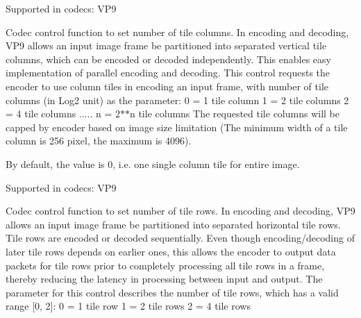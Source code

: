 \begin{Desc}
\begin{description}
Supported in codecs\+: V\+P9 \item[{\em 
V\+P9\+E\+\_\+\+S\+E\+T\+\_\+\+T\+I\+L\+E\+\_\+\+C\+O\+L\+U\+M\+NS\hypertarget{group__vp8__encoder_gga6deae3d561c838952552c3d3756322eca9c221dc99c51eb5e6304461aed9b5f5b}{}\label{group__vp8__encoder_gga6deae3d561c838952552c3d3756322eca9c221dc99c51eb5e6304461aed9b5f5b}
}]Codec control function to set number of tile columns. In encoding and decoding, V\+P9 allows an input image frame be partitioned into separated vertical tile columns, which can be encoded or decoded independently. This enables easy implementation of parallel encoding and decoding. This control requests the encoder to use column tiles in encoding an input frame, with number of tile columns (in Log2 unit) as the parameter\+: 0 = 1 tile column 1 = 2 tile columns 2 = 4 tile columns ..... n = 2$\ast$$\ast$n tile columns The requested tile columns will be capped by encoder based on image size limitation (The minimum width of a tile column is 256 pixel, the maximum is 4096).

By default, the value is 0, i.\+e. one single column tile for entire image.

Supported in codecs\+: V\+P9 \item[{\em 
V\+P9\+E\+\_\+\+S\+E\+T\+\_\+\+T\+I\+L\+E\+\_\+\+R\+O\+WS\hypertarget{group__vp8__encoder_gga6deae3d561c838952552c3d3756322eca5c6da58a82728ce850d0b2c9188f9fa2}{}\label{group__vp8__encoder_gga6deae3d561c838952552c3d3756322eca5c6da58a82728ce850d0b2c9188f9fa2}
}]Codec control function to set number of tile rows. In encoding and decoding, V\+P9 allows an input image frame be partitioned into separated horizontal tile rows. Tile rows are encoded or decoded sequentially. Even though encoding/decoding of later tile rows depends on earlier ones, this allows the encoder to output data packets for tile rows prior to completely processing all tile rows in a frame, thereby reducing the latency in processing between input and output. The parameter for this control describes the number of tile rows, which has a valid range \mbox{[}0, 2\mbox{]}\+: 0 = 1 tile row 1 = 2 tile rows 2 = 4 tile rows


\end{description}
\end{Desc}
